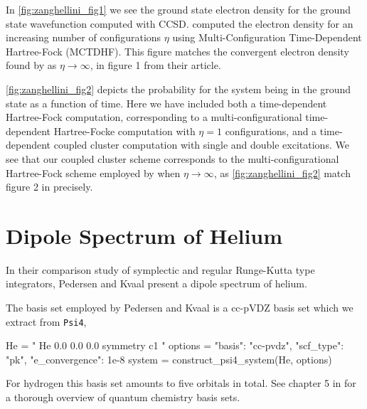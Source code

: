 In \autoref{fig:zanghellini_fig1} we see the ground state electron density for the 
ground state wavefunction computed with CCSD. \citeauthor{Zanghellini04} computed the electron
density for an increasing number of configurations $\eta$ using Multi-Configuration
Time-Dependent Hartree-Fock (MCTDHF). This figure matches the convergent electron density found by
\citeauthor{Zanghellini04} as $\eta \to \infty$, in figure 1 from their article. 

\autoref{fig:zanghellini_fig2} depicts the probability for the system being in the ground 
state as a function of time. Here we have included both a time-dependent Hartree-Fock
computation, corresponding to a multi-configurational time-dependent 
Hartree-Focke computation with $\eta=1$ configurations, and 
a time-dependent coupled cluster computation with single and double excitations.
We see that our coupled cluster scheme corresponds to the multi-configurational Hartree-Fock 
scheme employed by \citeauthor{Zanghellini04} when $\eta\to\infty$, as
\autoref{fig:zanghellini_fig2} match figure 2 in
\citeauthor{Zanghellini04} \cite{Zanghellini04} precisely.


\section{Dipole Spectrum of Helium}

In their comparison study of symplectic and regular Runge-Kutta type integrators, 
Pedersen and Kvaal \cite{pedersen2019symplectic} present a dipole 
spectrum of helium. 

The basis set employed by Pedersen and Kvaal is a cc-pVDZ 
basis set which we extract from \lstinline{Psi4},
\begin{python}
He = "
    He 0.0 0.0 0.0
    symmetry c1
"
options = {"basis": "cc-pvdz", "scf_type": "pk", "e_convergence": 1e-8}
system = construct_psi4_system(He, options)
\end{python}
For hydrogen this basis set amounts to five orbitals in total. See chapter 5 in
\citeauthor{jensen2017introduction} \cite{jensen2017introduction}for a thorough
overview of quantum chemistry basis sets.

